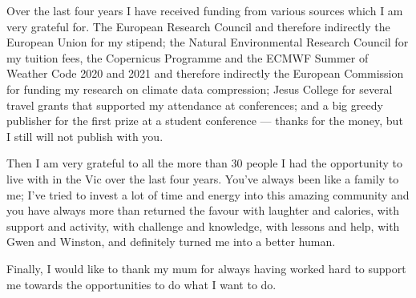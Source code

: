 \begin{acknowledgements}
Over the last four years I have received funding from various sources which I am very grateful for. The European
Research Council and therefore indirectly the European Union for my stipend; the Natural Environmental Research
Council for my tuition fees, the Copernicus Programme and the ECMWF Summer of Weather Code 2020 and 2021
and therefore indirectly the European Commission for funding my research on climate data compression; Jesus
College for several travel grants that supported my attendance at conferences; and a big greedy publisher for the first
prize at a student conference --- thanks for the money, but I still will not publish with you.

Then I am very grateful to all the more than 30 people I had the opportunity to live with in the Vic over the last four years.
You've always been like a family to me; I've tried to invest a lot of time and energy into this amazing community and you
have always more than returned the favour with laughter and calories, with support and activity, with challenge and
knowledge, with lessons and help, with Gwen and Winston, and definitely turned me into a better human.

Finally, I would like to thank my mum for always having worked hard to support me towards the opportunities to do what
I want to do.
 
\end{acknowledgements}
